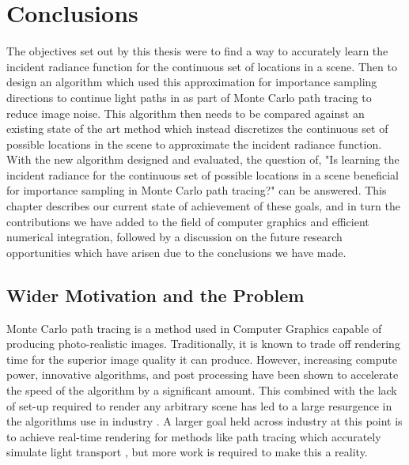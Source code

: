 \documentclass[../dissertation.tex]{subfiles}
\begin{document}
\chapter{Conclusions}
\label{chap:conclusion}

The objectives set out by this thesis were to find a way to accurately learn the incident radiance function for the continuous set of locations in a scene. Then to design an algorithm which used this approximation for importance sampling directions to continue light paths in as part of Monte Carlo path tracing to reduce image noise. This algorithm then needs to be compared against an existing state of the art method which instead discretizes the continuous set of possible locations in the scene to approximate the incident radiance function. With the new algorithm designed and evaluated, the question of, "Is learning the incident radiance for the continuous set of possible locations in a scene beneficial for importance sampling in Monte Carlo path tracing?" can be answered. This chapter describes our current state of achievement of these goals, and in turn the contributions we have added to the field of computer graphics and efficient numerical integration, followed by a discussion on the future research opportunities which have arisen due to the conclusions we have made.

\section{Wider Motivation and the Problem}

Monte Carlo path tracing is a method used in Computer Graphics capable of producing photo-realistic images. Traditionally, it is known to trade off rendering time for the superior image quality it can produce. However, increasing compute power, innovative algorithms, and post processing have been shown to accelerate the speed of the algorithm by a significant amount. This combined with the lack of set-up required to render any arbitrary scene has led to a large resurgence in the algorithms use in industry \cite{keller2015path}. A larger goal held across industry at this point is to achieve real-time rendering for methods like path tracing which accurately simulate light transport \cite{akenine2018real}, but more work is required to make this a reality.
\end{document}
